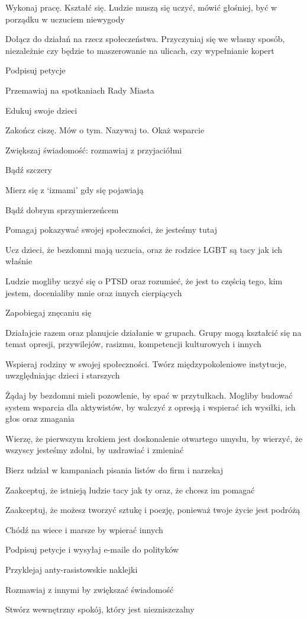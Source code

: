 \begin{multicols}{2}
	\begin{checkboxlist}
		\item Wykonaj pracę. Kształć się. Ludzie muszą się uczyć, mówić głośniej, być w porządku w uczuciem niewygody
		\item Dołącz do działań na rzecz społeczeństwa. Przyczyniaj się we własny sposób, niezależnie czy będzie to maszerowanie na ulicach, czy wypełnianie kopert
		\item Podpisuj petycje
		\item Przemawiaj na spotkaniach Rady Miasta
		\item Edukuj swoje dzieci
		\item Zakończ ciszę. Mów o tym. Nazywaj to. Okaż wsparcie
		\item Zwiększaj świadomość: rozmawiaj z przyjaciółmi
		\item Bądź szczery
		\item Mierz się z ‘izmami’ gdy się pojawiają
		\item Bądź dobrym sprzymierzeńcem
		\item Pomagaj pokazywać swojej społeczności, że jesteśmy tutaj
		\item Ucz dzieci, że bezdomni mają uczucia, oraz że rodzice LGBT są tacy jak ich właśnie
		\item Ludzie mogliby uczyć się o PTSD oraz rozumieć, że jest to częścią tego, kim jestem, docenialiby mnie oraz innych cierpiących
		\item Zapobiegaj znęcaniu się
		\item Działajcie razem oraz planujcie działanie w grupach. Grupy mogą kształcić się na temat opresji, przywilejów, rasizmu, kompetencji kulturowych i innych
		\item Wspieraj rodziny w swojej społeczności. Twórz międzypokoleniowe instytucje, uwzględniając dzieci i starszych
		\item Żądaj by bezdomni mieli pozowlenie, by spać w przytułkach. Mogliby budować system wsparcia dla aktywistów, by walczyć z opresją i wspierać ich wysiłki, ich głos oraz zmagania
		\item Wierzę, że pierwszym krokiem jest doskonalenie otwartego umysłu, by wierzyć, że wszyscy jesteśmy zdolni, by uzdrawiać i zmieniać
		\item Bierz udział w kampaniach pisania listów do firm i narzekaj
		\item Zaakceptuj, że istnieją ludzie tacy jak ty oraz, że chcesz im pomagać
		\item Zaakceptuj, że możesz tworzyć sztukę i poezję, ponieważ twoje życie jest podróżą
		\item Chódź na wiece i marsze by wpierać innych
		\item Podpisuj petycje i wysyłaj e-maile do polityków
		\item Przyklejaj anty-rasistowskie naklejki
		\item Rozmawiaj z innymi by zwiększać świadomość
		\item Stwórz wewnętrzny spokój, który jest niezniszczalny
	\end{checkboxlist}
\end{multicols}

